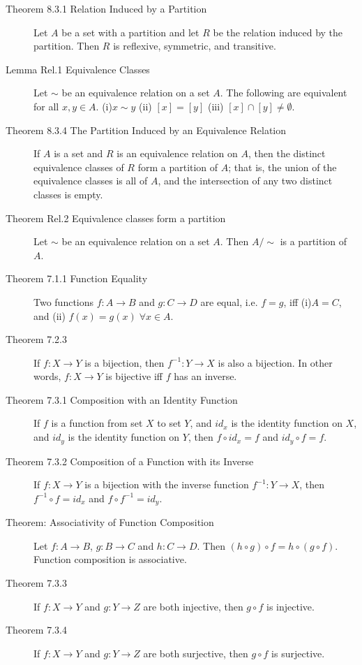 \documentclass{article}
\begin{document}
\begin{description}
	 \item[Theorem 8.3.1 Relation Induced by a Partition]Let $A$ be a set with a partition and let $R$ be the relation induced by the partition. Then $R$ is reflexive, symmetric, and transitive.
	 \item[Lemma Rel.1 Equivalence Classes]Let $\sim$ be an equivalence relation on a set $A$. The following are equivalent for all $x, y\in A$. (i)$x\sim y$ \qquad (ii) $[x]=[y]$ \qquad (iii) $[x]\cap[y]\neq \emptyset$.
	 \item[Theorem 8.3.4 The Partition Induced by an Equivalence Relation] If $A$ is a set and $R$ is an equivalence relation on $A$, then the distinct equivalence classes of $R$ form a partition of $A$; that is, the union of the equivalence classes is all of $A$, and the intersection of any two distinct classes is empty.
	 \item[Theorem Rel.2 Equivalence classes form a partition]Let $\sim$ be an equivalence relation on a set $A$. Then $A/{\sim}$ is a partition of $A$.
	 
	 \item[Theorem 7.1.1 Function Equality]Two functions $f:A\to B$ and $g:C\to D$ are equal, i.e. $f=g$, iff (i)$A=C$, and (ii) $f(x)=g(x)\;\forall x\in A$.
	 \item[Theorem 7.2.3] If $f:X\to Y$ is a bijection, then $f^{-1}:Y\to X$ is also a bijection. In other words, $f:X\to Y$ is bijective iff $f$ has an inverse.
	 \item[Theorem 7.3.1 Composition with an Identity Function]If $f$ is a function from set $X$ to set $Y$, and $id_{x}$ is the identity function on $X$, and $id_{y}$ is the identity function on $Y$, then $f\circ id_{x}=f$ and $id_{y}\circ f=f$.
	 \item[Theorem 7.3.2 Composition of a Function with its Inverse]If $f:X\to Y$ is a bijection with the inverse function $f^{-1}:Y\to X$, then $f^{-1}\circ f=id_{x}$ and $f\circ f^{-1}=id_{y}$.
	 \item[Theorem: Associativity of Function Composition]Let $f:A\to B$, $g:B\to C$ and $h:C\to D$. Then $(h\circ g)\circ f = h\circ (g\circ f)$. Function composition is associative. 
	 \item[Theorem 7.3.3] If $f:X\to Y$ and $g:Y\to Z$ are both injective, then $g\circ f$ is injective. 
	 \item[Theorem 7.3.4] If $f:X\to Y$ and $g:Y\to Z$ are both surjective, then $g\circ f$ is surjective.

\end{description}
\end{document}
